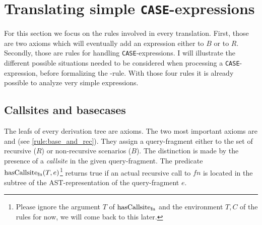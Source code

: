 \section{Translating simple \texttt{CASE}-expressions}

For this section we focus on the rules involved in every translation. First, those are two axioms which will eventually add an expression either to $B$ or to $R$. Secondly, those are rules for handling \texttt{CASE}-expressions. I will illustrate the different possible situations needed to be considered when processing a \texttt{CASE}-expression, before formalizing the \RWHEN-rule. With those four rules it is already possible to analyze very simple expressions.

\subsection{Callsites and basecases}

The leafs of every derivation tree are axioms. The two most important axioms are \RREC and \RBASE (see \autoref{rule:base_and_rec}). They assign a query-fragment either to the set of recursive ($R$) or non-recursive scenarios ($B$). The distinction is made by the presence of a \textit{callsite} in the given query-fragment. The predicate $\operatorname{\text{hasCallsite}_{fn}}(T, e)$\footnote{Please ignore the argument $T$ of $\operatorname{\text{hasCallsite}_{fn}}$ and the environment $T, C$ of the rules for now, we will come back to this later.} returns true if an actual recursive call to $fn$ is located in the subtree of the AST-representation of the query-fragment $e$.


